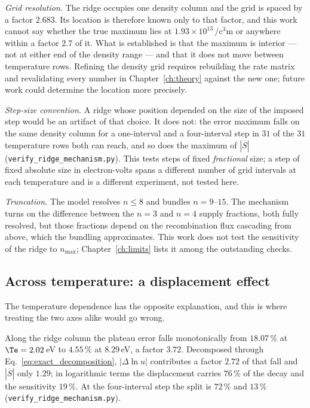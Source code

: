 \emph{Grid resolution.} The ridge occupies one density column and the grid is
spaced by a factor $2.683$. Its location is therefore known only to that factor,
and this work cannot say whether the true maximum lies at
$1.93\times10^{13}\,\si{\per\cubic\centi\metre}$ or anywhere within a factor
$2.7$ of it. What is established is that the maximum is interior --- not at
either end of the density range --- and that it does not move between
temperature rows. Refining the density grid requires rebuilding the rate matrix
and revalidating every number in Chapter~\ref{ch:theory} against the new one;
future work could determine the location more precisely.

\emph{Step-size convention.} A ridge whose position depended on the size of the
imposed step would be an artifact of that choice. It does not: the error maximum
falls on the same density column for a one-interval and a four-interval step in
$31$ of the $31$ temperature rows both can reach, and so does the maximum of
$|\overline{S}|$ (\texttt{verify\_ridge\_mechanism.py}). This tests steps of
fixed \emph{fractional} size; a step of fixed absolute size in electron-volts
spans a different number of grid intervals at each temperature and is a
different experiment, not tested here.

\emph{Truncation.} The model resolves $n\le8$ and bundles $n=9$--$15$. The
mechanism turns on the difference between the $n=3$ and $n=4$ supply fractions,
both fully resolved, but those fractions depend on the recombination flux
cascading from above, which the bundling approximates. This work does not test
the sensitivity of the ridge to $n_{\max}$; Chapter~\ref{ch:limits} lists it
among the outstanding checks.

\subsection{Across temperature: a displacement effect}
\label{sec:temperature_mechanism}

The temperature dependence has the opposite explanation, and this is where
treating the two axes alike would go wrong.

Along the ridge column the plateau error falls monotonically from $18.07\,\%$ at
$\Te = 2.02\,$eV to $4.55\,\%$ at $8.29\,$eV, a factor $3.72$. Decomposed
through Eq.~\eqref{eq:exact_decomposition}, $|\Delta\ln u|$ contributes a factor
$2.72$ of that fall and $|\overline{S}|$ only $1.29$; in logarithmic terms the
displacement carries $76\,\%$ of the decay and the sensitivity $19\,\%$. At the
four-interval step the split is $72\,\%$ and $13\,\%$
(\texttt{verify\_ridge\_mechanism.py}).

